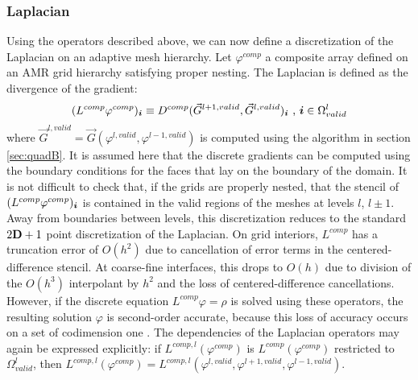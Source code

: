\subsubsection*{Laplacian \label{subsect:compLap}}
Using the operators described above, we can now define a discretization
of the Laplacian on an adaptive mesh hierarchy. Let
$\varphi^{comp}$ a composite array defined on an AMR grid hierarchy
satisfying proper nesting.
The Laplacian is defined as the divergence of the gradient:
\begin{equation}
(L^{comp} \varphi^{comp})_{\boldsymbol{i}} \equiv
D^{comp}(\vec{G}^{l+1,valid},\vec{G}^{l,valid})_{\boldsymbol{i}} \mbox{ , } 
{\boldsymbol{i}} \in \Omega^l_{valid}
\label{eqn:compLap}  
\end{equation}
where $\vec{G}^{l,valid} = \vec{G}(\varphi^{l,valid},\varphi^{l-1,valid})$
is computed using the algorithm in section \ref{sec:quadB}.
It is assumed here that
the discrete gradients can be computed using the boundary conditions 
for the faces that lay on the boundary of the domain. It is not difficult to
check that, if the grids are properly nested, that the stencil of
$(L^{comp} \varphi^{comp})_{\boldsymbol{i}}$ is contained in the valid regions of the
meshes at levels $l$, $l \pm 1$. Away from boundaries between levels,
this discretization reduces to the standard $2{\mathbf{D}} + 1$ point
discretization of the Laplacian.
%
On grid interiors, $L^{comp}$ has a truncation error of $O(h^2)$ due
to cancellation of error terms in the centered-difference stencil.  At
coarse-fine interfaces, this drops to $O(h)$ due to division of the
$O(h^3)$ interpolant by $h^2$ and the loss of centered-difference
cancellations.  However, if the discrete equation $L^{comp}
\varphi = \rho$ is solved using these operators, the resulting solution $\varphi$ is
second-order accurate, because this loss of accuracy occurs on a set
of codimension one \cite{JohansenColella1998}. The dependencies of the Laplacian
operators may again be expressed explicitly: if
$L^{comp,l}(\varphi^{comp})$ is $L^{comp}(\varphi^{comp})$ restricted to 
$\Omega^l_{valid}$, then $L^{comp,l}(\varphi^{comp}) = 
L^{comp,l}(\varphi^{l,valid}, \varphi^{l+1,valid}, \varphi^{l-1,valid})$.

